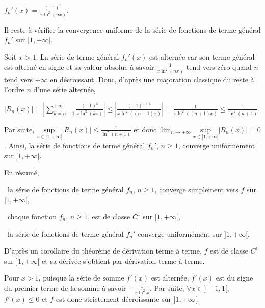 {\begin{enumerate}
{\begin{center}
$f_n'(x) =\frac{(-1)^n}{x\ln^2(nx)}$.
\end{center}

Il reste à vérifier la convergence uniforme de la série de fonctions de terme général $f_n'$ sur $]1,+\infty[$.

Soit $x > 1$. La série de terme général $f_n'(x)$ est alternée car son terme général est alterné en signe et sa valeur absolue à savoir $\frac{1}{x\ln^2(nx)}$ tend vers zéro quand $n$ tend vers $+\infty$ en décroissant. Donc, d'après une majoration classique du reste à l'ordre $n$ d'une série alternée,

\begin{center}
$|R_n(x)|=\left|\sum_{k=n+1}^{+\infty}\frac{(-1)^k}{x\ln^2(kx)}\right|\leqslant\left|\frac{(-1)^{n+1}}{x\ln^2((n+1)x)}\right|=\frac{1}{x\ln^2((n+1)x)}\leqslant\frac{1}{\ln^2(n+1)}$.
\end{center}

Par suite, $\underset{x\in]1,+\infty[}{\text{sup}}|R_n(x)|\leqslant\frac{1}{\ln^2(n+1)}$ et donc $\lim_{n \rightarrow +\infty}\underset{x\in]1,+\infty[}{\text{sup}}|R_n(x)|=0$. Ainsi, la série de fonctions de terme général $f_n'$, $n\geqslant1$, converge uniformément sur $]1,+\infty[$.

En résumé,

\textbullet~la série de fonctions de terme général $f_n$, $n\geqslant1$, converge simplement vers $f$ sur $]1,+\infty[$,

\textbullet~chaque fonction $f_n$, $n\geqslant1$, est de classe $C^1$ sur $]1,+\infty[$,

\textbullet~la série de fonctions de terme général $f_n'$ converge uniformément sur $]1,+\infty[$.

D'après un corollaire du théorème de dérivation terme à terme, $f$ est de classe $C^1$ sur $]1,+\infty[$ et sa dérivée s'obtient par dérivation terme à terme. 

\begin{center}
\fbox{
$f$ est de classe $C^1$ sur $]1,+\infty[$ et $\forall x>1$, $f'(x) =\sum_{n=1}^{+\infty}\frac{(-1)^n}{x\ln^2(nx)}$.
}
\end{center}

Pour $x >1$, puisque la série de somme $f'(x)$ est alternée, $f'(x)$ est du signe du premier terme de la somme à savoir $-\frac{1}{x\ln^2x}$. Par suite, $\forall x\in]-1,1[$, $f'(x)\leqslant0$ et $f$ est donc strictement décroissante sur $]1,+\infty[$.

\begin{center}
\fbox{
La fonction $f$ est décroissante sur $]1,+\infty[$.
}
\end{center}}
\end{enumerate}
}
